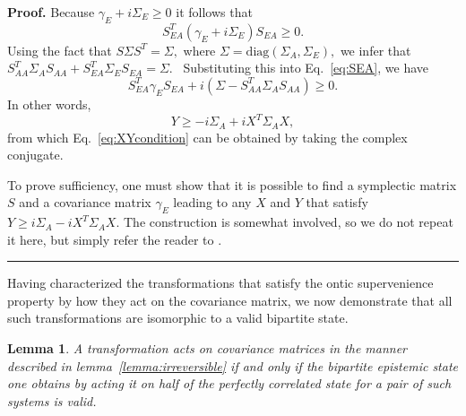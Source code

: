 \documentclass[pra,superscriptaddress,nofootinbib,12pt]{revtex4-2}
\newtheorem{lemma}[theorem]{Lemma}
\newenvironment{proof}[1][Proof]{\noindent\textbf{#1.} }{\ \rule{0.5em}{0.5em}}
\begin{document}
\begin{proof}
Because $\gamma_{E}+i\Sigma_{E}\geq0$ it follows that
\begin{equation}
S_{EA}^{T}\left(  \gamma_{E}+i\Sigma_{E}\right)  S_{EA}\geq0.\label{eq:SEA}
\end{equation}
Using the fact that $S\Sigma S^{T}=\Sigma,$ where $\Sigma=\mathrm{diag}\left(
\Sigma_{A},\Sigma_{E}\right)  ,$ we infer that $S_{AA}^{T}\Sigma_{A}%
S_{AA}+S_{EA}^{T}\Sigma_{E}S_{EA}=\Sigma.$ \ Substituting this into Eq.~\eqref{eq:SEA}, we
have
\[
S_{EA}^{T}\gamma_{E}S_{EA}+i\left(  \Sigma-S_{AA}^{T}\Sigma_{A}S_{AA}\right)
\geq0.
\]
In other words,%
\[
Y\geq-i\Sigma_{A}+iX^{T}\Sigma_{A}X,
\]
from which Eq.~\eqref{eq:XYcondition} can be obtained by taking the complex
conjugate.

To prove sufficiency, one must show that it is possible to  find a
symplectic matrix $S$ and a covariance matrix $\gamma_{E}$ leading to any $X$
and $Y$ that satisfy $Y \geq i\Sigma_{A} - iX^{T}\Sigma_{A}X$. The construction is somewhat involved, so we do not repeat it here, but simply refer the reader to \cite{Caruso}.
\end{proof}

Having characterized the transformations that satisfy the ontic supervenience property
by how they act on the covariance matrix, we now demonstrate that all such transformations are isomorphic to a valid bipartite state.


\begin{lemma}
A transformation acts on covariance matrices in the manner described in lemma~\ref{lemma:irreversible} if and only if the bipartite epistemic state one obtains by acting it on half of the perfectly correlated state for a pair of such systems is valid.
\end{lemma}
\end{document}
